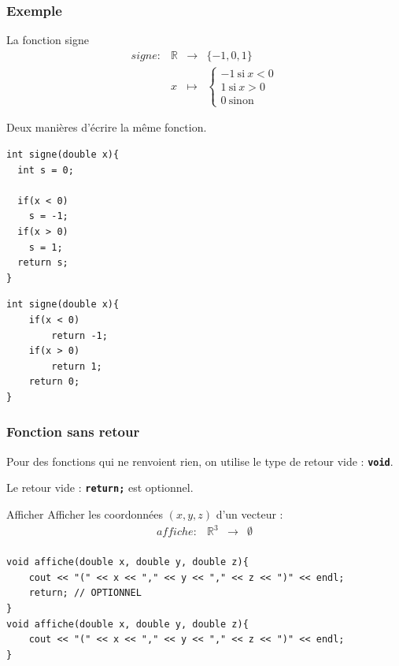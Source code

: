 \begin{frame}
\end{frame}

\begin{frame}[fragile]
\frametitle{Exemple}

\begin{block}{La fonction signe}
$$
\begin{array}{cccc}
signe: & \mathbb{R} & \to & \{-1,0,1\} \\
& x & \mapsto & \left\{
    \begin{split}
    -1 \: \text{si} \: x < 0\\
    1 \: \text{si}  \: x > 0\\
    0 \: \text{sinon}
    \end{split}
  \right.
\end{array}
$$
\end{block}
Deux manières d'écrire la même fonction.
\begin{minipage}{0.47\linewidth}
\begin{verbatim}
int signe(double x){
  int s = 0;
	  
  if(x < 0)
    s = -1;
  if(x > 0)
    s = 1;
  return s;
}
\end{verbatim}
\end{minipage}
\hfill
\begin{minipage}{0.47\linewidth}
\begin{verbatim}
int signe(double x){
    if(x < 0)
        return -1;
    if(x > 0)
        return 1;
    return 0;
}
\end{verbatim}
\end{minipage}
\end{frame}

\begin{frame}[fragile]
	\frametitle{Fonction sans retour}
	Pour des fonctions qui ne renvoient rien, on utilise le type de retour vide : \texttt{\textbf{void}}.

	Le retour vide : \texttt{\textbf{return;}} est optionnel.

	\begin{block}{Afficher}
	Afficher les coordonnées $(x,y,z)$ d'un vecteur :
		$$
		\begin{array}{cccc}
		affiche: & \mathbb{R}^3 & \to & \emptyset \\
		\end{array}
		$$
	\end{block}

	\begin{verbatim}
void affiche(double x, double y, double z){
    cout << "(" << x << "," << y << "," << z << ")" << endl;
    return; // OPTIONNEL
}
void affiche(double x, double y, double z){
    cout << "(" << x << "," << y << "," << z << ")" << endl;
}
	\end{verbatim}
\end{frame}

